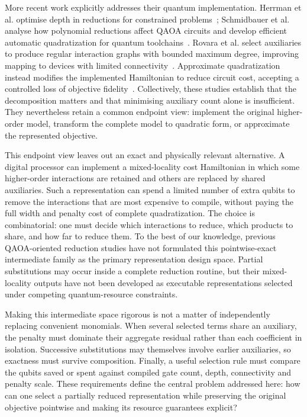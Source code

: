 \documentclass[a4paper,onecolumn,11pt,unpublished]{quantumarticle}
\theoremstyle{remark}
\begin{document}
More recent work explicitly addresses their quantum implementation.
Herrman et al. optimise depth in reductions for constrained
problems~\cite{Herrman2021}; Schmidbauer et al. analyse how polynomial
reductions affect QAOA circuits and develop efficient automatic
quadratization for quantum toolchains~\cite{Schmidbauer2024,Schmidbauer2026}.
Rovara et al. select auxiliaries to produce regular interaction graphs with
bounded maximum degree, improving mapping to devices with limited
connectivity~\cite{Rovara2026}. Approximate quadratization instead modifies the
implemented Hamiltonian to reduce circuit cost, accepting a controlled loss of
objective fidelity~\cite{Dragoi2026}. Collectively, these studies establish that
the decomposition matters and that minimising auxiliary count alone is
insufficient. They nevertheless retain a common endpoint view: implement the
original higher-order model, transform the complete model to quadratic form,
or approximate the represented objective.

This endpoint view leaves out an exact and physically relevant alternative.
A digital processor can implement a mixed-locality cost Hamiltonian in which
some higher-order interactions are retained and others are replaced by shared
auxiliaries. Such a representation can spend a limited number of extra qubits
to remove the interactions that are most expensive to compile, without paying
the full width and penalty cost of complete quadratization. The choice is
combinatorial: one must decide which interactions to reduce, which products to
share, and how far to reduce them. To the best of our knowledge, previous
QAOA-oriented reduction studies have not formulated this pointwise-exact
intermediate family as the primary representation design space. Partial
substitutions may occur inside a complete reduction routine, but their
mixed-locality outputs have not been developed as executable representations
selected under competing quantum-resource constraints.

Making this intermediate space rigorous is not a matter of independently
replacing convenient monomials. When several selected terms share an
auxiliary, the penalty must dominate their aggregate residual rather than each
coefficient in isolation. Successive substitutions may themselves involve
earlier auxiliaries, so exactness must survive composition. Finally, a useful
selection rule must compare the qubits saved or spent against compiled gate
count, depth, connectivity and penalty scale. These requirements define the
central problem addressed here: how can one select a partially reduced
representation while preserving the original objective pointwise and making
its resource guarantees explicit?
\end{document}
